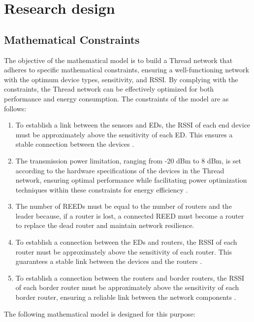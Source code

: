 \chapter{Research design}\label{chap:research}

\section{Mathematical Constraints}

The objective of the mathematical model is to build a Thread network that adheres to specific mathematical constraints, ensuring a well-functioning network with the optimum device types, sensitivity, and RSSI. By complying with the constraints, the Thread network can be effectively optimized for both performance and energy consumption. The constraints of the model are as follows:

\begin{enumerate}
    \item To establish a link between the sensors and EDs, the RSSI of each end device must be approximately above the sensitivity of each ED. This ensures a stable connection between the devices \cite{wu2014study}.
    \item The transmission power limitation, ranging from -20 dBm to 8 dBm, is set according to the hardware specifications of the devices in the Thread network, ensuring optimal performance while facilitating power optimization techniques within these constraints for energy efficiency \cite{semiconductor_nrf52840_2018_1}.
    \item The number of REEDs must be equal to the number of routers and the leader because, if a router is lost, a connected REED must become a router to replace the dead router and maintain network resilience.
    \item To establish a connection between the EDs and routers, the RSSI of each router must be approximately above the sensitivity of each router. This guarantees a stable link between the devices and the routers \cite{wu2014study}.
    \item To establish a connection between the routers and border routers, the RSSI of each border router must be approximately above the sensitivity of each border router, ensuring a reliable link between the network components \cite{wu2014study}.
\end{enumerate}

The following mathematical model is designed for this purpose:

